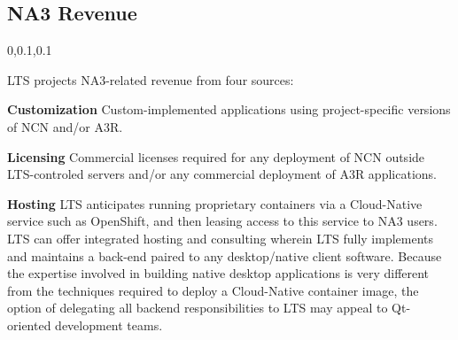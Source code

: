
\begin{frame}{}
\section{NA3 Revenue}
\vspace{-.5em}	

{\Large{}\selectfont
\hspace*{-20pt}\begin{minipage}{1.08\textwidth}
\vspace{4pt}


		
\begin{lightquadblockc}{0,0.1,0.1}{\parbox{21cm}{\centering \vspace{10pt}LTS projects NA3-related 
		revenue from four sources:\vspace{3pt}}}
\begin{center}\begin{minipage}{\textwidth}
{\LARGE \setlength{\leftmargini}{30pt}\begin{enumerate}
\dmitem \textbf{Customization} \hspace{.5em} Custom-implemented applications 
using project-specific versions of NCN and/or A3R.

\dmitem \textbf{Licensing}  \hspace{.5em} Commercial licenses required for 
any deployment of NCN outside LTS-controled 
servers and/or any commercial deployment of A3R 
applications.

\dmitem \textbf{Hosting}  \hspace{.5em} LTS anticipates running proprietary 
containers via a Cloud-Native service such as 
OpenShift, and then leasing access to this service 
to NA3 users.  LTS can offer integrated hosting and consulting 
wherein LTS fully implements and maintains a back-end 
paired to any desktop/native client software.
Because the expertise involved 
in building native desktop applications is very different 
from the techniques required to deploy a Cloud-Native container 
image, the option of delegating all 
backend responsibilities to LTS may 
appeal to Qt-oriented development teams.


\end{enumerate}}
\end{minipage}
\end{center}
\end{lightquadblockc}
\end{minipage}}
\end{frame}
